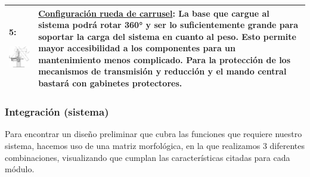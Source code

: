 \begin{table}[H]
\begin{tabular}{@{}|p{7cm}|p{7cm}|}
		\\ \hline
		5:
		\begin{center}
			\includegraphics[width=5cm]{imagenes/soporte3}
		\end{center}
		&
		\underline{Configuración rueda de carrusel}: La base que cargue al sistema podrá rotar 360° y ser lo suficientemente grande para soportar la carga del sistema en cuanto al peso. Esto permite mayor accesibilidad a los componentes para un mantenimiento menos complicado. Para la protección de los mecanismos de transmisión y reducción y el mando central bastará con gabinetes protectores.
		\\ \hline
	\end{tabular}		
	\label{tabla:soporte}
\end{table}

\newpage
\subsubsection{Integración (sistema)}
Para encontrar un diseño preliminar que cubra las funciones que requiere nuestro sistema, hacemos uso de una matriz morfológica, en la que realizamos 3 diferentes combinaciones, visualizando que cumplan las características citadas para cada módulo.

